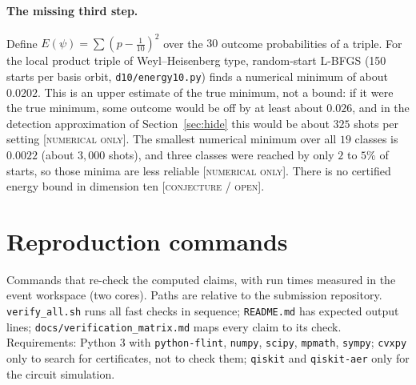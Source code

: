 \documentclass[11pt]{article}
\newcommand{\E}{E}                       %
\newcommand{\st}[1]{\textsc{[#1]}}
\newcommand{\stnum}{\st{numerical only}}
\newcommand{\stconj}{\st{conjecture / open}}
\theoremstyle{definition}
\theoremstyle{remark}
\begin{document}
\paragraph{The missing third step.} Define $\E(\psi)=\sum(p-\tfrac1{10})^2$ over the $30$ outcome probabilities of a
triple. For the local product triple of Weyl--Heisenberg type, random-start L-BFGS (150 starts per basis orbit,
\texttt{d10/energy10.py}) finds a numerical minimum of about $0.0202$. This is an upper estimate of the true minimum, not a bound: if it were the true minimum, some outcome would be off by at least about $0.026$, and in the
detection approximation of Section~\ref{sec:hide} this would be about $325$ shots per setting \stnum. The smallest numerical minimum over all $19$ classes is $0.0022$ (about $3{,}000$ shots), and
three classes were reached by only $2$ to $5\%$ of starts, so those minima are less reliable \stnum. There is no
certified energy bound in dimension ten \stconj.

\section{Reproduction commands}\label{app:repro}

Commands that re-check the computed claims, with run times measured in the event workspace (two cores). Paths are
relative to the submission repository. \texttt{verify\_all.sh} runs all fast checks in sequence;
\texttt{README.md} has expected output lines; \texttt{docs/verification\_matrix.md} maps every claim to its
check. Requirements: Python 3 with \texttt{python-flint}, \texttt{numpy}, \texttt{scipy}, \texttt{mpmath},
\texttt{sympy}; \texttt{cvxpy} only to search for certificates, not to check them; \texttt{qiskit} and
\texttt{qiskit-aer} only for the circuit simulation.
\end{document}

